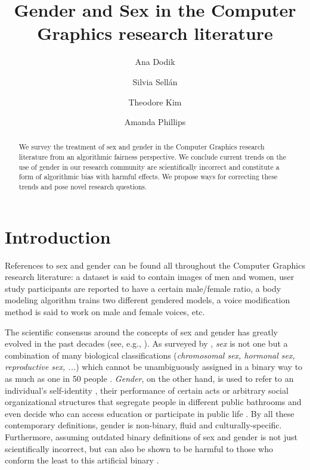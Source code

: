\documentclass[nonacm,sigconf,review,balance=false]{acmart}
\begin{document}
\title{Gender and Sex in the Computer Graphics research literature}

\author{Ana Dodik}

\author{Silvia Sellán}\authornotemark[1]


\author{Theodore Kim}

\author{Amanda Phillips}


\begin{abstract}
    We survey the treatment of sex and gender in the Computer Graphics research
    literature from an algorithmic fairness perspective. We conclude
    current trends on the use of gender in our research community are scientifically incorrect and constitute a
    form of algorithmic bias with harmful effects. We propose ways for
    correcting these trends and pose novel research questions.
\end{abstract}


\maketitle


\section{Introduction}

References to sex and gender can be found all throughout the Computer Graphics research literature: a dataset is said to contain images of men and women, user study participants are reported to have a certain male/female ratio, a body modeling algorithm trains two different gendered models, a voice modification method is said to work on male and female voices, etc.

The scientific consensus around the concepts of sex and gender has greatly evolved in the past decades (see, e.g., \cite{pmid30377332}). As surveyed by \citet{fausto2012sex}, \emph{sex} is not one but a combination of many biological classifications (\emph{chromosomal sex, hormonal sex, reproductive sex, ...}) which cannot be unambiguously assigned in a binary way to as much as one in 50 people \cite{blackless2000sexually}.
\emph{Gender}, on the other hand, is used to refer to an individual's self-identity \cite{money1972man}, their performance of certain acts \cite{butler2003gender} or arbitrary social organizational structures that segregate people in different public bathrooms and even decide who can access education or participate in public life \cite{lorber1994paradoxes}. By all these contemporary definitions, gender is non-binary, fluid and culturally-specific. Furthermore, assuming outdated binary definitions of sex and gender is not just scientifically incorrect, but can also be shown to be harmful to those who conform the least to this artificial binary \cite{un2015report}.
\end{document}
